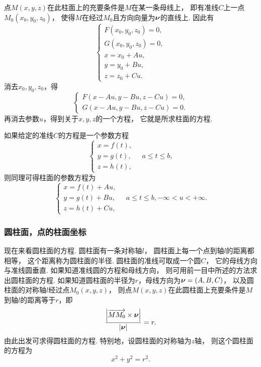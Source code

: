 点\(M(x,y,z)\)在此柱面上的充要条件是\(M\)在某一条母线上，
即有准线\(C\)上一点\(M_0(x_0,y_0,z_0)\)，
使得\(M\)在经过\(M_0\)且方向向量为\(\boldsymbol{\nu}\)的直线上.
因此有\[
	\left\{ \begin{array}{l}
		F(x_0,y_0,z_0) = 0, \\
		G(x_0,y_0,z_0) = 0, \\
		x = x_0 + Au, \\
		y = y_0 + Bu, \\
		z = z_0 + Cu.
	\end{array} \right.
\]
消去\(x_0,y_0,z_0\)，得\[
	\left\{ \begin{array}{l}
		F(x - Au,y - Bu,z - Cu) = 0, \\
		G(x - Au,y - Bu,z - Cu) = 0.
	\end{array} \right.
\]
再消去参数\(u\)，得到关于\(x,y,z\)的一个方程，
它就是所求柱面的方程.

如果给定的准线\(C\)的方程是一个参数方程\[
	\left\{ \begin{array}{l}
		x = f(t), \\
		y = g(t), \\
		z = h(t),
	\end{array} \right.
	\quad a \leq t \leq b,
\]
则同理可得柱面的参数方程为\[
	\left\{ \begin{array}{l}
		x = f(t) + Au, \\
		y = g(t) + Bu, \\
		z = h(t) + Cu,
	\end{array} \right.
	\quad
	a \leq t \leq b,
	-\infty < u < +\infty.
\]

\subsubsection{圆柱面，点的柱面坐标}
现在来看圆柱面的方程.
圆柱面有一条对称轴\(l\)，
圆柱面上每一个点到轴\(l\)的距离都相等，
这个距离称为圆柱面的半径.
圆柱面的准线可取成一个圆\(C\)，
它的母线方向与准线圆垂直.
如果知道准线圆的方程和母线方向，
则可用前一目中所述的方法求出圆柱面的方程.
如果知道圆柱面的半径为\(r\)，母线方向为\(\boldsymbol{\nu}=(A,B,C)\)，
以及圆柱面的对称轴\(l\)经过点\(M_0(x,y,z)\)，
则点\(M(x,y,z)\)在此圆柱面上充要条件是\(M\)到轴\(l\)的距离等于\(r\)，即\[
	\frac{\abs{\overrightarrow{M M_0} \times \boldsymbol{\nu}}}{\abs{\boldsymbol{\nu}}} = r.
\]
由此出发可求得圆柱面的方程.
特别地，设圆柱面的对称轴为\(z\)轴，
则这个圆柱面的方程为
\begin{equation}\label{equation:解析几何.以z轴为对称轴r为半径的圆柱面的一般方程}
	x^2+y^2=r^2.
\end{equation}

